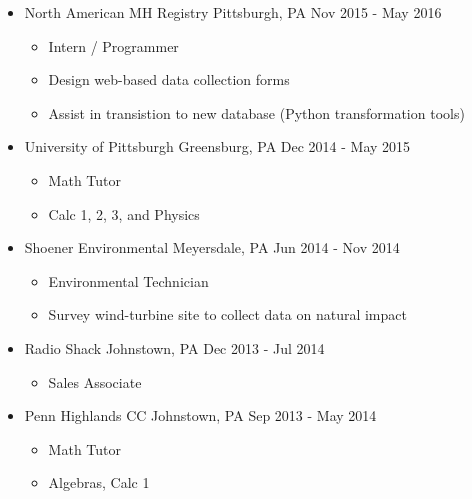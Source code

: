 \documentclass[18pt]{article}
\providecommand{\tightlist}{%
    \setlength{\itemsep}{0pt}\setlength{\parskip}{0pt}}
\begin{document}
\begin{itemize}
\tightlist
\item
  North American MH Registry \textbar{} Pittsburgh, PA \textbar{} Nov
  2015 - May 2016

  \begin{itemize}
  \tightlist
  \item
    Intern / Programmer
  \item
    Design web-based data collection forms
  \item
    Assist in transistion to new database (Python transformation tools)
  \end{itemize}
\item
  University of Pittsburgh \textbar{} Greensburg, PA \textbar{} Dec 2014
  - May 2015

  \begin{itemize}
  \tightlist
  \item
    Math Tutor
  \item
    Calc 1, 2, 3, and Physics
  \end{itemize}
\item
  Shoener Environmental \textbar{} Meyersdale, PA \textbar{} Jun 2014 -
  Nov 2014

  \begin{itemize}
  \tightlist
  \item
    Environmental Technician
  \item
    Survey wind-turbine site to collect data on natural impact
  \end{itemize}
\item
  Radio Shack \textbar{} Johnstown, PA \textbar{} Dec 2013 - Jul 2014

  \begin{itemize}
  \tightlist
  \item
    Sales Associate
  \end{itemize}
\item
  Penn Highlands CC \textbar{} Johnstown, PA \textbar{} Sep 2013 - May
  2014

  \begin{itemize}
  \tightlist
  \item
    Math Tutor
  \item
    Algebras, Calc 1
  \end{itemize}
\end{itemize}
\end{document}
